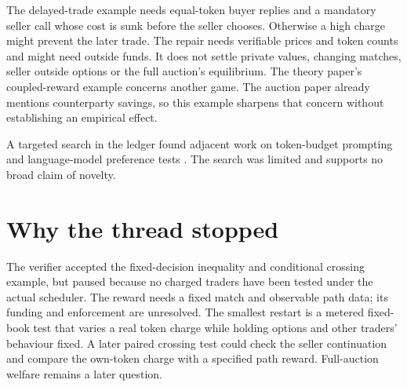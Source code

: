 \documentclass{article}
\begin{document}
The delayed-trade example needs equal-token buyer replies and a mandatory seller call whose cost is
sunk before the seller chooses. Otherwise a high charge might prevent the later trade. The repair
needs verifiable prices and token counts and might need outside funds. It does not settle private
values, changing matches, seller outside options or the full auction's equilibrium. The theory
paper's coupled-reward example concerns another game. The auction paper already mentions
counterparty savings, so this example sharpens that concern without establishing an empirical
effect.

A targeted search in the ledger found adjacent work on token-budget prompting \cite{tokenbudget} and
language-model preference tests \cite{preferences}. The search was limited and supports no broad
claim of novelty.

\section{Why the thread stopped}

The verifier accepted the fixed-decision inequality and conditional crossing example, but paused
because no charged traders have been tested under the actual scheduler. The reward needs a fixed
match and observable path data; its funding and enforcement are unresolved. The smallest restart is
a metered fixed-book test that varies a real token charge while holding options and other traders'
behaviour fixed. A later paired crossing test could check the seller continuation and compare the
own-token charge with a specified path reward. Full-auction welfare remains a later question.



\end{document}
